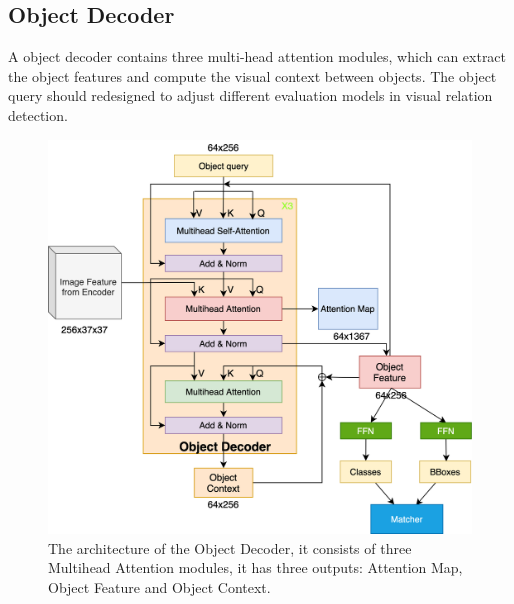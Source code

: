 
\label{sec:objectdecoder}
\subsection{Object Decoder }

A object decoder contains three multi-head attention modules, which can extract the object features and compute the visual context between objects. The object query should redesigned to adjust different evaluation models in visual relation detection.

\begin{figure}[tbph!]
	\centering
	\includegraphics[width=0.9\linewidth]{figures/object_decoder}
	\caption[Illustration of the Object Decoder]{The architecture of the Object Decoder, it consists of three Multihead Attention modules, it has three outputs: Attention Map, Object Feature and Object Context.}
	\label{fig:objectdecoder}
\end{figure}


